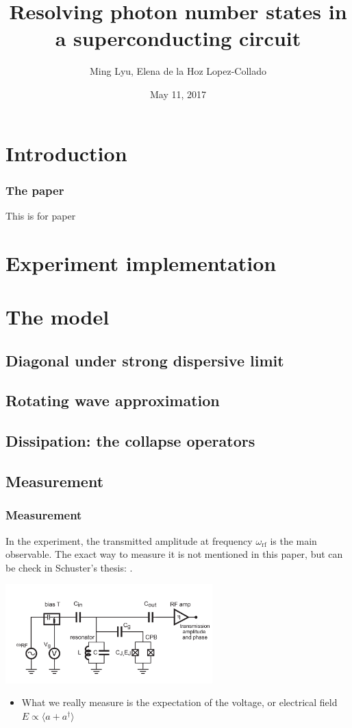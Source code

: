 \documentclass[12pt,hyperref={CJKbookmarks=true}]{beamer}
\title[Nature 445, 515-518]{Resolving photon number states in a superconducting circuit}
\author[Ming, Elena]{Ming Lyu, Elena de la Hoz Lopez-Collado}
\institute[Princeton]{Final projects for ELE456 at Princeton}
\date{May 11, 2017}
\newcommand{\rf}{\text{rf}}
\begin{document}
\begin{frame}
\titlepage
\end{frame}
\begin{frame}
    \tableofcontents
\end{frame}

\section{Introduction} 
\begin{frame}[t]\frametitle{The paper}
    
This is for paper \cite{schuster2007resolving} %

\end{frame}

\section{Experiment implementation}

\section{The model}
\subsection{Diagonal under strong dispersive limit}
\subsection{Rotating wave approximation}
\subsection{Dissipation: the collapse operators}
\subsection{Measurement}
\begin{frame}[t]\frametitle{Measurement}
In the experiment, the transmitted amplitude at frequency $\omega_{\rf}$ is the main observable. The exact way to measure it is not mentioned in this paper, 
but can be check in Schuster's thesis: \cite{schuster2007circuit}. 
\begin{center}
  \includegraphics[width=0.6\textwidth]{figure/measurement.png}
\end{center}
	\begin{itemize}
		\item What we really measure is the expectation of the voltage, or 
		electrical field $E\propto\langle a + a^\dag \rangle$
	\end{itemize}

\end{frame}
\end{document}

